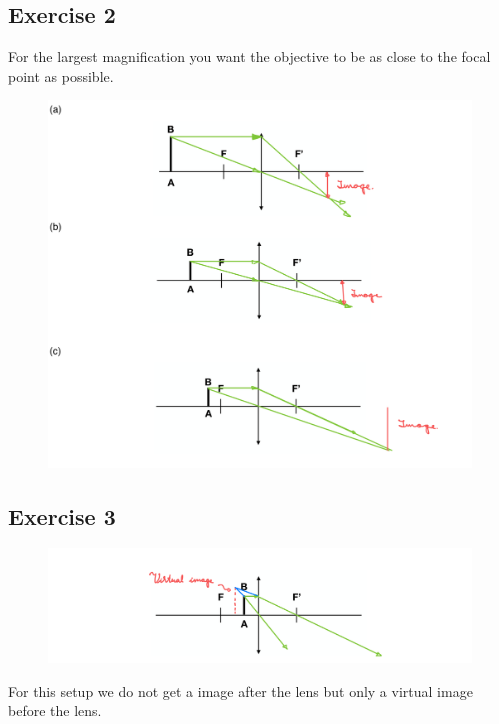 \documentclass[a4paper]{scrartcl}
\begin{document}
\subsection*{Exercise 2}
For the largest magnification you want the objective to be as close to the focal point as possible.
\begin{figure}[H]
  \centering
  \includegraphics[width=\linewidth,keepaspectratio]{first.png}
\end{figure}

\newpage

\subsection*{Exercise 3}
\begin{figure}[H]
  \centering
  \includegraphics[width=\linewidth,keepaspectratio]{last.png}
\end{figure}

For this setup we do not get a image after the lens but only a virtual image before the lens.
\end{document}
